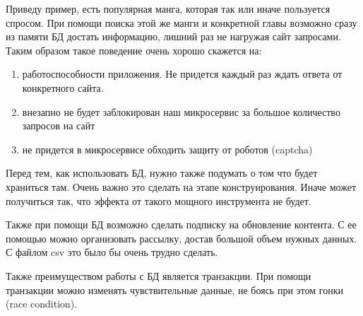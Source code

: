 Приведу пример, есть популярная манга, которая так или иначе пользуется спросом.
При помощи поиска этой же манги и конкретной главы возможно сразу из памяти БД достать информацию, лишний раз не нагружая сайт запросами.
Таким образом такое поведение очень хорошо скажется на:
\begin{enumerate}
    \item работоспособности приложения. Не придется каждый раз ждать ответа от конкретного сайта.
    \item внезапно не будет заблокирован наш микросервис за большое количество запросов на сайт
    \item не придется в микросервисе обходить защиту от роботов (captcha)
\end{enumerate} 

Перед тем, как использовать БД, нужно также подумать о том что будет храниться там. Очень важно это сделать на этапе конструирования.
Иначе может получиться так, что эффекта от такого мощного инструмента не будет.

Также при помощи БД возможно сделать подписку на обновление контента. С ее помощью можно организовать рассылку, достав большой объем нужных данных.
С файлом csv это было бы очень трудно сделать.

Также преимуществом работы с БД является транзакции.
При помощи транзакции можно изменять чувствительные данные, не боясь при этом гонки (race condition).